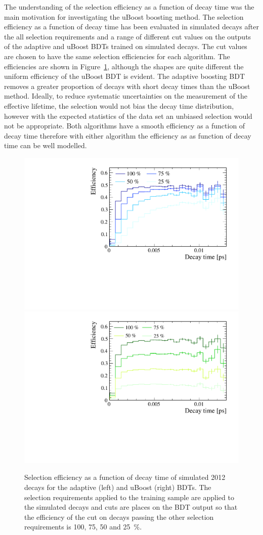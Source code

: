 The understanding of the selection efficiency as a function of decay time was the main motivation for investigating the uBoost boosting method.%
The selection efficiency as a function of decay time has been evaluated in simulated \bsmumu decays after the all selection requirements and a range of different cut values on the outputs of the adaptive and uBoost BDTs trained on simulated decays. The cut values are chosen to have the same selection efficiencies for each algorithm. The efficiencies are shown in Figure~\ref{fig:accptsELBDTs}, although the shapes are quite different the uniform efficiency of the uBoost BDT is evident. The adaptive boosting BDT removes a greater proportion of decays with short decay times than the uBoost method. Ideally, to reduce systematic uncertainties on the measurement of the effective lifetime, the selection would not bias the decay time distribution, however with the expected statistics of the data set an unbiased selection would not be appropriate. Both algorithms have a smooth efficiency as a function of decay time therefore with either algorithm the efficiency as as function of decay time can be well modelled. 
\begin{figure}[htbp]
    \centering
        \includegraphics[width=0.49 \textwidth]{./Figs/Selection/BDT_acceptances.pdf}
       \includegraphics[width=0.49 \textwidth]{./Figs/Selection/uBoost_accpt.pdf}
    \caption{Selection efficiency as a function of decay time of simulated 2012 \bsmumu decays for the adaptive (left) and uBoost (right) BDTs. The selection requirements applied to the training sample are applied to the simulated decays and cuts are places on the BDT output so that the efficiency of the cut on decays passing the other selection requirements is 100, 75, 50 and 25~$\%$. }
    \label{fig:accptsELBDTs}
\end{figure}

